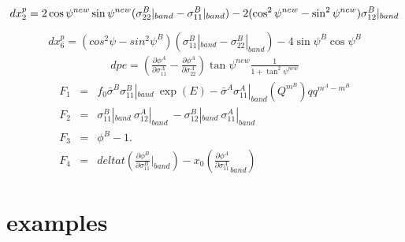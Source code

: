 \documentclass[12pt]{amsart}
\begin{document}
\begin{equation}
  \label{eq:dxp}
  dx^p_2=2\cos\psi^{new}\sin\psi^{new}(\sigma_{22}^B|_{band}-\sigma_{11}^B|_{band}) \\
  - 2 (\cos^2\psi^{new}-\sin^2\psi^{new}) \sigma_{12}^B|_{band}
\end{equation}

\begin{equation}
  \label{eq:dxp}
  dx^p_6=(cos^2\psi-sin^2\psi^B) (\sigma^B_{11}|_{band}-\sigma^B_{22}|_{band}) - 4 \sin\psi^B \cos\psi^B
\end{equation}
\begin{eqnarray}
  \label{eq:dpe}
  dpe = (\frac{\partial \phi^A}{\partial\sigma^A_{11}}-\frac{\partial \phi^A}{\partial\sigma^A_{22}}) \tan\psi^{new} \frac{1}{1+\tan^2\psi^{new}}
\end{eqnarray}
\begin{eqnarray}
  \label{eq:func2_Fi}
  F_1&=&f_0 \bar{\sigma}^B\sigma_{11}^B|_{band}\ \exp(E) - \bar{\sigma}^A \sigma_{11}^A|_{band} (Q^{m^B})qq^{m^A-m^B}\\
  F_2&=&\sigma_{11}^B|_{band}\ \sigma_{12}^A|_{band}\ -\sigma_{12}^B|_{band}\ \sigma_{11}^A|_{band}\\
  F_3&=&\phi^B-1.\\
  F_4&=&deltat (\frac{\partial \phi^B}{\partial\sigma^B_{11}}|_{band}) - x_0 (\frac{\partial \phi^A}{\partial\sigma^A_{11}}_{band})
\end{eqnarray}

\section{examples}
\end{document}
